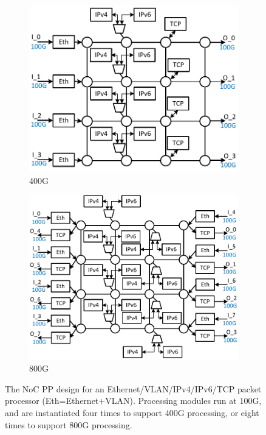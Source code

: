 
%
\begin{figure}
\centering
%
        \begin{subfigure}[t]{0.45\textwidth}
        		\includegraphics[width=\textwidth]{figs/noc-pp-uni.pdf}
        		\caption{400G}
        		\label{400g}
		\end{subfigure}
        \begin{subfigure}[t]{0.45\textwidth}
        		\includegraphics[width=\textwidth]{figs/noc-pp-bi.pdf}
        		\caption{800G}
        		\label{800g}
		\end{subfigure}
\caption{The NoC PP design for an Ethernet/VLAN/IPv4/IPv6/TCP packet processor (Eth=Ethernet+VLAN). Processing modules run at 100G, and are instantiated four times to support 400G processing, or eight times to support 800G processing.}
\label{noc-pp}
\end{figure}
%


